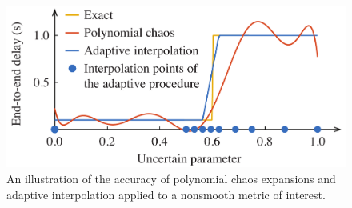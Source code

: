 \begin{figure}
  \centering
  \includegraphics[width=1.0\columnwidth]{include/assets/figures/motivation.pdf}
  \vspace{-1.5em}
  \caption{
    An illustration of the accuracy of polynomial chaos expansions and adaptive
    interpolation applied to a nonsmooth metric of interest.
  }
\end{figure}
